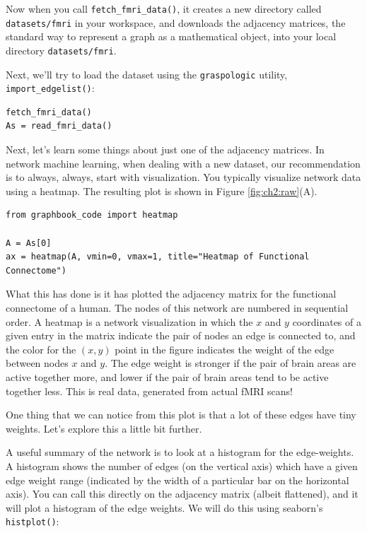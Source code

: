 Now when you call \texttt{fetch\_fmri\_data()}, it creates a new directory called \texttt{datasets/fmri} in your workspace, and downloads the adjacency matrices, the standard way to represent a graph as a mathematical object, into your local directory \texttt{datasets/fmri}.

Next, we'll try to load the dataset using the \texttt{graspologic} utility, \texttt{import\_edgelist()}:

\begin{lstlisting}[style=python]
fetch_fmri_data()
As = read_fmri_data()
\end{lstlisting}

Next, let's learn some things about just one of the adjacency matrices. In network machine learning, when dealing with a new dataset, our recommendation is to {always}, {always}, start with visualization. You typically visualize network data using a heatmap. The resulting plot is shown in Figure \ref{fig:ch2:raw}(A).

\begin{lstlisting}[style=python]
from graphbook_code import heatmap

A = As[0]
ax = heatmap(A, vmin=0, vmax=1, title="Heatmap of Functional Connectome")
\end{lstlisting}

What this has done is it has plotted the adjacency matrix for the functional connectome of a human. The nodes of this network are numbered in sequential order. A heatmap is a network visualization in which the $x$ and $y$ coordinates of a given entry in the matrix indicate the pair of nodes an edge is connected to, and the color for the $(x,y)$ point in the figure indicates the weight of the edge between nodes $x$ and $y$. The edge weight is stronger if the pair of brain areas are active together more, and lower if the pair of brain areas tend to be active together less. This is real data, generated from actual fMRI scans!

One thing that we can notice from this plot is that a lot of these edges have tiny weights. Let's explore this a little bit further. 

A useful summary of the network is to look at a histogram for the edge-weights. A histogram shows the number of edges (on the vertical axis) which have a given edge weight range (indicated by the width of a particular bar on the horizontal axis). You can call this directly on the adjacency matrix (albeit flattened), and it will plot a histogram of the edge weights. We will do this using seaborn's \texttt{histplot()}:

